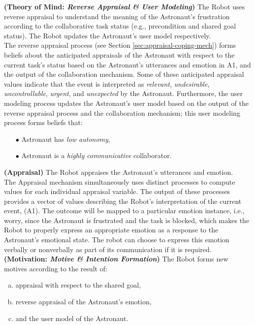 \noindent \textbf{(Theory of Mind: \textit{Reverse Appraisal \& User
Modeling})} The Robot uses reverse appraisal to understand the meaning of the
Astronaut's frustration according to the collaborative task status (e.g.,
precondition and shared goal status). The Robot updates the Astronaut's user
model respectively.\\

The reverse appraisal process (see Section \ref{sec:appraisal-coping-mech})
forms beliefs about the anticipated appraisals of the Astronaut with respect to
the current task's status based on the Astronaut's utterances and emotion in A1,
and the output of the collaboration mechanism. Some of these anticipated
appraisal values indicate that the event is interpreted as \textit{relevant},
\textit{undesirable}, \textit{uncontrollable}, \textit{urgent}, and
\textit{unexpected} by the Astronaut. Furthermore, the user modeling process
updates the Astronaut's user model based on the output of the reverse appraisal
process and the collaboration mechanism; this user modeling process forms
beliefs that:

\begin{itemize}
  \item[$\bullet$] Astronaut has \textit{low autonomy},
  \item[$\bullet$] Astronaut is a \textit{highly communicative} collaborator.
\end{itemize}

\noindent \textbf{(Appraisal)} The Robot appraises the Astronaut's utterances
and emotion.\\

The Appraisal mechanism simultaneously uses distinct processes to compute values
for each individual appraisal variable. The output of these processes provides a
vector of values describing the Robot's interpretation of the current event,
(A1). The outcome will be mapped to a particular emotion instance, i.e., worry,
since the Astronaut is frustrated and the task is blocked, which makes the Robot
to properly express an appropriate emotion as a response to the Astronaut's
emotional state. The robot can choose to express this emotion verbally or
nonverbally as part of its communication if it is required.\\

\noindent \textbf{(Motivation: \textit{Motive \& Intention Formation})}
The Robot forms new motives according to the result of:

\begin{enumerate}[a)]
  \item appraisal with respect to the shared goal,
  \item reverse appraisal of the Astronaut's emotion,
  \item and the user model of the Astronaut. 
\end{enumerate}

